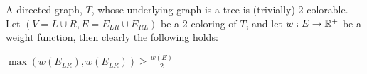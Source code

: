\label{sec:bipartition}
A directed graph, $T$, whose underlying graph is a tree is (trivially) 2-colorable.
Let $(V = L \cup R, E = E_{LR} \cup E_{RL})$ be a 2-coloring of $T$, 
and let $w:E \rightarrow \mathbb{R^+}$ be a weight function, then clearly the following holds: 
\begin{observation}
\label{ob:bipartition}
$\max(w(E_{LR}), w(E_{LR})) \geq \frac{w(E)}{2}$
\end{observation}
